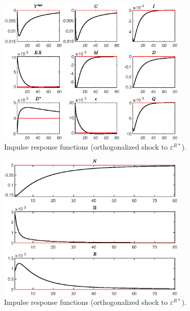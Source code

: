  
\begin{figure}[H]
\centering 
\includegraphics[width=0.80\textwidth]{ABK2016/graphs/ABK2016_IRF_varepsilon_Rstar1}
\caption{Impulse response functions (orthogonalized shock to $\varepsilon^{R*}$).}\label{Fig:IRF:varepsilon_Rstar:1}
\end{figure}
 
\begin{figure}[H]
\centering 
\includegraphics[width=0.80\textwidth]{ABK2016/graphs/ABK2016_IRF_varepsilon_Rstar2}
\caption{Impulse response functions (orthogonalized shock to $\varepsilon^{R*}$).}\label{Fig:IRF:varepsilon_Rstar:2}
\end{figure}
 
 
